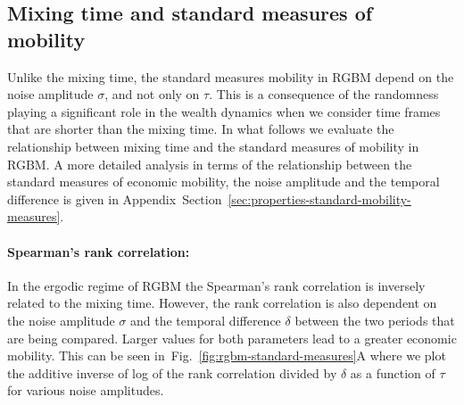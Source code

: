 \documentclass[11pt]{article}
\newcommand{\Sref}[1]{Section~\ref{sec:#1}}
\newcommand{\fref}[1]{Fig.~\ref{fig:#1}}
\numberwithin{equation}{section}
\begin{document}

\FloatBarrier
\subsection{Mixing time and standard measures of mobility}\label{sec:measures}
Unlike the mixing time, the standard measures mobility in RGBM depend on the noise amplitude $\sigma$, and not only on $\tau$. This is a consequence of the randomness playing a significant role in the wealth dynamics when we consider time frames that are shorter than the mixing time. In what follows we evaluate the relationship between mixing time and the standard measures of mobility in RGBM. A more detailed analysis in terms of the relationship between the standard measures of economic mobility, the noise amplitude and the temporal difference is given in Appendix~\Sref{properties-standard-mobility-measures}.

\paragraph{Spearman's rank correlation:} In the ergodic regime of RGBM the Spearman's rank correlation is inversely related to the mixing time. However, the rank correlation is also dependent on the noise amplitude $\sigma$ and the temporal difference $\delta$ between the two periods that are being compared. Larger values for both parameters lead to a greater economic mobility. This can be seen in~\fref{rgbm-standard-measures}A where we plot the additive inverse of log of the rank correlation divided by $\delta$ as a function of $\tau$ for various noise amplitudes.
\end{document}
